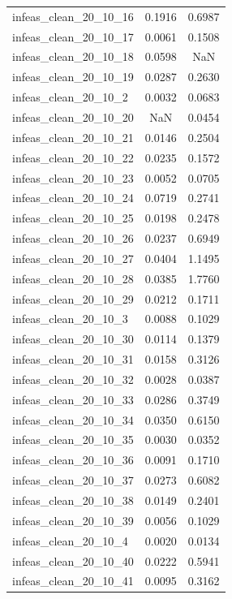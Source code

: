 \begin{longtable}{lcc}
infeas\_clean\_20\_10\_16  &   0.1916 &  0.6987 \\
infeas\_clean\_20\_10\_17  &   0.0061 &  0.1508 \\
infeas\_clean\_20\_10\_18  &   0.0598 &     NaN \\
infeas\_clean\_20\_10\_19  &   0.0287 &  0.2630 \\
infeas\_clean\_20\_10\_2   &   0.0032 &  0.0683 \\
infeas\_clean\_20\_10\_20  &      NaN &  0.0454 \\
infeas\_clean\_20\_10\_21  &   0.0146 &  0.2504 \\
infeas\_clean\_20\_10\_22  &   0.0235 &  0.1572 \\
infeas\_clean\_20\_10\_23  &   0.0052 &  0.0705 \\
infeas\_clean\_20\_10\_24  &   0.0719 &  0.2741 \\
infeas\_clean\_20\_10\_25  &   0.0198 &  0.2478 \\
infeas\_clean\_20\_10\_26  &   0.0237 &  0.6949 \\
infeas\_clean\_20\_10\_27  &   0.0404 &  1.1495 \\
infeas\_clean\_20\_10\_28  &   0.0385 &  1.7760 \\
infeas\_clean\_20\_10\_29  &   0.0212 &  0.1711 \\
infeas\_clean\_20\_10\_3   &   0.0088 &  0.1029 \\
infeas\_clean\_20\_10\_30  &   0.0114 &  0.1379 \\
infeas\_clean\_20\_10\_31  &   0.0158 &  0.3126 \\
infeas\_clean\_20\_10\_32  &   0.0028 &  0.0387 \\
infeas\_clean\_20\_10\_33  &   0.0286 &  0.3749 \\
infeas\_clean\_20\_10\_34  &   0.0350 &  0.6150 \\
infeas\_clean\_20\_10\_35  &   0.0030 &  0.0352 \\
infeas\_clean\_20\_10\_36  &   0.0091 &  0.1710 \\
infeas\_clean\_20\_10\_37  &   0.0273 &  0.6082 \\
infeas\_clean\_20\_10\_38  &   0.0149 &  0.2401 \\
infeas\_clean\_20\_10\_39  &   0.0056 &  0.1029 \\
infeas\_clean\_20\_10\_4   &   0.0020 &  0.0134 \\
infeas\_clean\_20\_10\_40  &   0.0222 &  0.5941 \\
infeas\_clean\_20\_10\_41  &   0.0095 &  0.3162 \\

\end{longtable}
